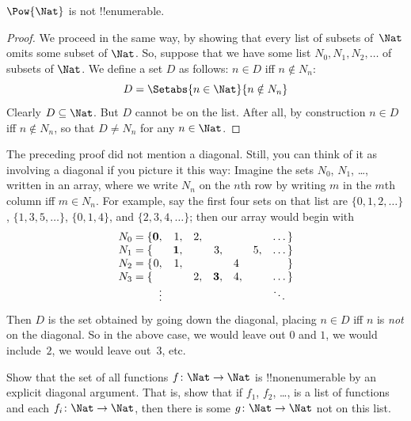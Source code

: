 \documentclass[../../../include/open-logic-section]{subfiles}
\begin{document}
\begin{thm}
$\Pow{\Nat}$ is not !!{enumerable}.
\end{thm}

\begin{proof}
We proceed in the same way, by showing that every list of subsets
of~$\Nat$ omits some subset of $\Nat$. So, suppose that we have some
list $N_0, N_1, N_2, \ldots$ of subsets of $\Nat$. We define a set $D$
as follows: $n \in D$ iff $n \notin N_{n}$:
\[
D = \Setabs{n \in \Nat}{n \notin N_n}
\]
Clearly $D\subseteq \Nat$. But $D$ cannot be on the list. After all,
by construction $n \in D$ iff $n\notin N_n$, so that $D \neq N_n$ for
any $n \in \Nat$. 
\end{proof}

\begin{explain}
The preceding proof did not mention a diagonal. Still, you can think
of it as involving a diagonal if you picture it this way: Imagine the
sets $N_0$, $N_1$, \dots, written in an array, where we write $N_n$ on
the $n$th row by writing $m$ in the $m$th column iff $m \in N_n$.
For example, say the first four sets on that list are
$\{0,1,2,\dots\}$, $\{1, 3, 5, \dots\}$, $\{0,1,4\}$, and
$\{2,3,4,\dots\}$; then our array would begin with
\[
\begin{array}{r@{}rrrrrrr}
  N_0 = \{ & \mathbf{0}, & 1, & 2, & & & & \dots\}\\
  N_1 = \{ &  & \mathbf{1}, &  & 3, &  & 5, & \dots\}\\
  N_2 = \{ & 0, & 1, &  &  & 4\phantom{,} &  & \}\\
  N_3 = \{ &  &  & 2, & \mathbf{3}, & 4, & & \dots\}\\
  &\vdots & & & & & & \ddots\phantom{\}}
  \end{array}
\]
Then $D$ is the set obtained by going down the diagonal, placing $n
\in D$ iff $n$ is \emph{not} on the diagonal. So in the above case, we
would leave out $0$ and $1$, we would include~$2$, we would leave
out~$3$, etc.
\end{explain}

\begin{prob}
Show that the set of all functions $f \colon \Nat \to \Nat$ is
!!{nonenumerable} by an explicit diagonal argument. That is, show that
if $f_1$, $f_2$, \dots, is a list of functions and each $f_i\colon
\Nat \to \Nat$, then there is some $g \colon \Nat \to
\Nat$ not on this list.
\end{prob}
\end{document}

